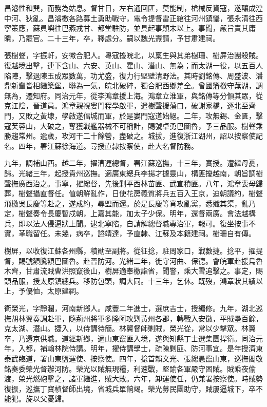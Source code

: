 \begin{pinyinscope}
昌濬性和巽，而務為姑息。督甘日，左右通回匪，莫能制，槍械反資寇，遂釀成湟中河、狄亂。昌濬檄各路募土勇助戰守，電令提督雷正綰往河州鎮懾，張永清往西寧策應，蘇員嶼往巴燕戎甘、都堂駐防，並具起事顛末以上。事聞，嚴旨責其庸瞶，乃罷官。二十三年，卒，釋處分。嗣以魏光燾請，予甘肅建祠。

張樹聲，字振軒，安徽合肥人。粵寇擾皖北，以稟生與其弟樹珊、樹屏治團殺賊。復越境出擊，連下含山、六安、英山、霍山、潛山、無為；而太湖一役，以五百人陷陣，擊退陳玉成眾數萬，功尤盛，復力行堅壁清野法。其時劉銘傳、周盛波、潘鼎新輩皆相繼築堡，聯為一氣，皖北破碎，獨合肥西鄉差全。曾國籓檄守蕪湖，調無為，遷知府。同治元年，從李鴻章援上海。鴻章立淮軍，與銘傳等分領其眾，從克江陰，晉道員。鴻章親視婁門程學啟軍，遣樹聲援蕩口，破謝家橋，逐北至齊門，又敗之黃埭，學啟遂偪城而軍，於是婁門寇道始絕。二年，攻無錫、金匱，擊寇芙蓉山，大破之，奪獲戰艦器械不可稱計，賜號卓勇巴圖魯，予三品服。樹聲乘勝趨常州。逾歲，攻河干二十餘營，盡破之。城拔，進復浙江湖州，詔以按察使記名。四年，署江蘇徐海道。尋授直隸按察使，赴大名督防務。

九年，調補山西。越二年，擢漕運總督，署江蘇巡撫，十三年，實授。遭繼母憂，歸。光緒三年，起授貴州巡撫。適廣東總兵李揚才據靈山，構匪擾越南，朝旨調樹聲撫廣西治之。事寧，擢總督，先後剿平西林苗匪、武宣積匪。八年，鴻章喪母歸葬，樹聲攝直督任。值朝鮮亂作，日使花房義質將兵五百入王京，迫朝議約，樹聲飛檄吳長慶等赴之，遂成約，尋盟而還。於是長慶等宵攻亂黨，悉殲其渠，亂乃定，樹聲奏令長慶暫戍朝，上嘉其能，加太子少保。明年，還督兩廣。會法越構兵，即以法人侵逼狀上聞。逮北寧陷，自請解總督職專治軍，報可。復坐按事不實，革職留任。未幾，病卒，謚靖達，予直隸、江蘇及本籍建祠。樹珊自有傳。

樹屏，以收復江蘇各州縣，積勛至副將。從征捻，駐周家口，戰數捷。捻平，擢提督，賜號額騰額巴圖魯。赴晉防河。光緒二年，徙守河曲、保德。會皖軍赴援烏魯木齊，甘肅流賊曹洪照竄後山，樹屏適奉檄詣省，聞警，乘大雪追擊之。事定，賜頭品服，授太原鎮總兵。移防包頭，調大同。十三年，乞休。既歿，鴻章狀其績以上，予優恤，太原建祠。

衛榮光，字靜瀾，河南新鄉人。咸豐二年進士，選庶吉士，授編修。九年，湖北巡撫胡林翼奏調赴軍，隨荊州將軍多隆阿攻剿黃州各郡，轉戰入安徽，平賊壘百餘，克太湖、潛山。捷入，以侍講待簡。林翼督師剿賊，榮光從，常以少擊眾。林翼卒，乃還京供職。道經新鄉，適山東竄匪入境，遂與知縣丁士選集團捍衛。同治元年，入都，補翰林院侍講。明年，擢侍講學士，疏陳剿匪、防河事宜。是年授濟東泰武臨道，署山東鹽運使、按察使。四年，捻首賴文光、張總愚竄山東，巡撫閻敬銘奏委榮光督辦河防。榮光以賊無現糧，利速戰，堅諭各軍嚴守困賊。賊乘夜偷渡，榮光燃砲擊之，諸軍繼進，賊大敗。六年，卸運使任，仍兼署按察使。時賊勢復振，巡撫丁寶楨督師出境，省城兵單餉竭。榮光募民團助守，賊屢逼城下，卒不能犯。旋以父憂歸。


\end{pinyinscope}
